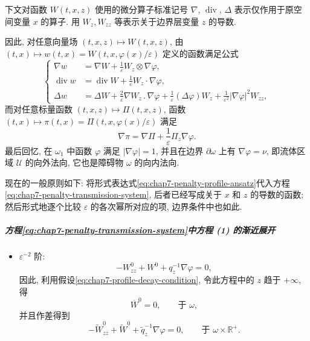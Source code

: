 \begin{sloppypar}
下文对函数 $W(t,x,z)$ 使用的微分算子标准记号 $\nabla$, $\operatorname{div}$, $\Delta$ 表示仅作用于原空间变量 $x$ 的算子. 用 $W_z,W_{zz}$ 等表示关于边界层变量 $z$ 的导数.

因此, 对任意向量场 $(t,x,z)\mapsto W(t,x,z)$, 由 $(t,x)\mapsto w(t,x)=W(t,x,\varphi(x)/\varepsilon)$ 定义的函数满足公式
\begin{equation}
\left\{
\begin{aligned}
 \nabla w&=\nabla W+\frac1\varepsilon W_z\otimes\nabla\varphi,\\
 \operatorname{div}w&=\operatorname{div}W+\frac1\varepsilon W_z\cdot\nabla\varphi,\\
 \Delta w&=\Delta W+\frac2\varepsilon\nabla W_z\mathbin{.}\nabla\varphi
 +\frac1\varepsilon(\Delta\varphi)W_z
 +\frac1{\varepsilon^2}|\nabla\varphi|^2W_{zz},
\end{aligned}
\right.
\label{eq:chap7-boundary-layer-differential-formulas}
\end{equation}
而对任意标量函数 $(t,x,z)\mapsto\Pi(t,x,z)$, 函数 $(t,x)\mapsto\pi(t,x)=\Pi(t,x,\varphi(x)/\varepsilon)$ 满足
\[
 \nabla\pi=\nabla\Pi+\frac1\varepsilon\Pi_z\nabla\varphi.
\]
最后回忆, 在 $\omega_1$ 中函数 $\varphi$ 满足 $|\nabla\varphi|=1$, 并且在边界 $\partial\omega$ 上有 $\nabla\varphi=\nu$, 即流体区域 $\mathcal U$ 的向外法向, 它也是障碍物 $\omega$ 的向内法向.

现在的一般原则如下: 将形式表达式\eqref{eq:chap7-penalty-profile-ansatz}代入方程\eqref{eq:chap7-penalty-transmission-system}, 后者已经写成关于 $x$ 和 $z$ 的导数的函数; 然后形式地逐个比较 $\varepsilon$ 的各次幂所对应的项, 边界条件中也如此.

\subparagraph{方程\eqref{eq:chap7-penalty-transmission-system}中方程 (1) 的渐近展开}

\begin{itemize}
\item $\varepsilon^{-2}$ 阶:
\[
 -W^0_{zz}+W^0+q^{-1}_z\nabla\varphi=0,
\]
因此, 利用假设\eqref{eq:chap7-profile-decay-condition}, 令此方程中的 $z$ 趋于 $+\infty$, 得
\begin{equation}
 \overline W^0=0,\qquad\text{于 }\omega,
\label{eq:chap7-interior-W0-zero}
\end{equation}
并且作差得到
\begin{equation}
 -\widetilde W^0_{zz}+\widetilde W^0+\widetilde q^{-1}_z\nabla\varphi=0,
 \qquad\text{于 }\omega\times\mathbb R^+.
\label{eq:chap7-boundary-W0-equation}
\end{equation}


\end{itemize}
\end{sloppypar}

